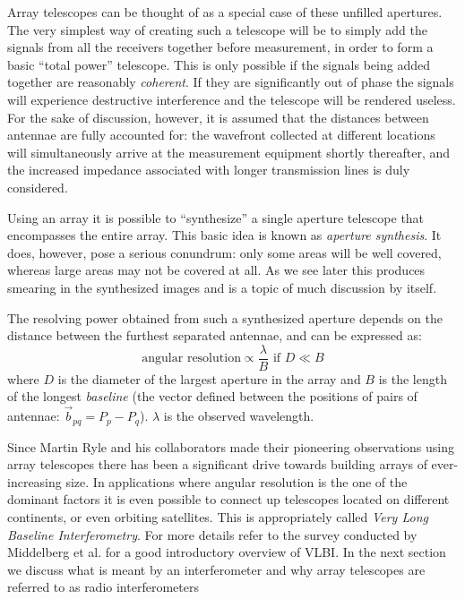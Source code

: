 Array telescopes can be thought of as a special case of these unfilled apertures. The very simplest way of creating such
a telescope will be to simply add the signals from all the receivers together before measurement, in order to form a 
basic ``total power'' telescope. This is only possible if the signals being added together are reasonably \textit{coherent}. If they
are significantly out of phase the signals will experience destructive interference and the telescope will be
rendered useless. For the sake of discussion, however, it is assumed that the distances between antennae are fully accounted for: the wavefront 
collected at different locations will simultaneously arrive at the measurement equipment shortly 
thereafter, and the increased impedance associated with longer transmission lines is duly considered.

Using an array it is possible to ``synthesize'' a single aperture telescope that encompasses the entire array. This
basic idea is known as \textit{aperture synthesis}. It does, however, pose a serious conundrum: only some areas will be well covered, whereas
large areas may not be covered at all. As we see later this produces smearing in the synthesized images and is a topic of much 
discussion by itself.

The resolving power obtained from such a synthesized aperture depends on the distance between the furthest separated 
antennae, and can be expressed as:
\begin{equation*}
 \text{angular resolution} \propto \frac{\lambda}{B} \text{ if } D\ll B
\end{equation*}
where $D$ is the diameter of the largest aperture in the array and $B$ is the length of the longest \textit{baseline} 
(the vector defined between the positions of pairs of antennae: $\vec{b}_{pq}=P_p - P_q$). $\lambda$ is the observed wavelength.

Since Martin Ryle and his collaborators made their pioneering observations using array telescopes there has been
a significant drive towards building arrays of ever-increasing size. In applications where angular resolution is
the one of the dominant factors it is even possible to connect up telescopes located on different continents, or even orbiting satellites.
This is appropriately called \textit{Very Long Baseline Interferometry}. For more details refer to the survey 
conducted by Middelberg et al. \cite{middelberg2008high} for a good introductory overview of VLBI. In the next section we discuss
what is meant by an interferometer and why array telescopes are referred to as radio interferometers

